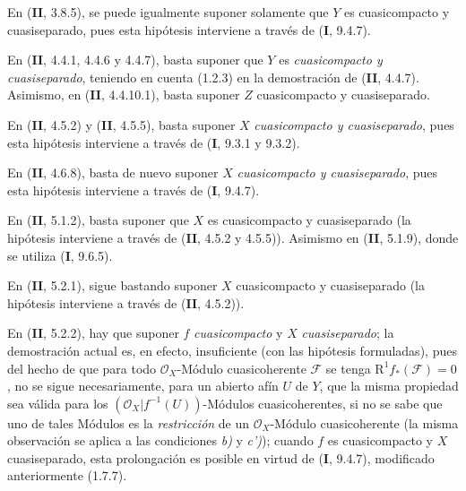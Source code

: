 \begin{env}[1.7.12]
\label{IV.1.7.12-fr}
En (\textbf{II}, 3.8.5), se puede igualmente suponer solamente que $Y$ es cuasicompacto
y cuasiseparado, pues esta hipótesis interviene a través de (\textbf{I}, 9.4.7).
\end{env}

\begin{env}[1.7.13]
\label{IV.1.7.13-fr}
En (\textbf{II}, 4.4.1, 4.4.6 y 4.4.7), basta suponer que $Y$ es
\emph{cuasicompacto y cuasiseparado}, teniendo en cuenta (1.2.3) en la
demostración de (\textbf{II}, 4.4.7). Asimismo, en (\textbf{II}, 4.4.10.1), basta
suponer $Z$ cuasicompacto y cuasiseparado.
\end{env}

\begin{env}[1.7.14]
\label{IV.1.7.14-fr}
En (\textbf{II}, 4.5.2) y (\textbf{II}, 4.5.5), basta suponer $X$
\emph{cuasicompacto y cuasiseparado}, pues esta hipótesis interviene a través de (\textbf{I},
9.3.1 y 9.3.2).
\end{env}

\begin{env}[1.7.15]
\label{IV.1.7.15-fr}
En (\textbf{II}, 4.6.8), basta de nuevo suponer $X$ \emph{cuasicompacto y
cuasiseparado}, pues esta hipótesis interviene a través de (\textbf{I}, 9.4.7).
\end{env}

\begin{env}[1.7.16]
\label{IV.1.7.16-fr}
En (\textbf{II}, 5.1.2), basta suponer que $X$ es cuasicompacto y
cuasiseparado (la hipótesis interviene a través de (\textbf{II}, 4.5.2 y 4.5.5)). Asimismo en
(\textbf{II}, 5.1.9), donde se utiliza (\textbf{I}, 9.6.5).
\end{env}

\begin{env}[1.7.17]
\label{IV.1.7.17-fr}
En (\textbf{II}, 5.2.1), sigue bastando suponer $X$ cuasicompacto y
cuasiseparado (la hipótesis interviene a través de (\textbf{II}, 4.5.2)).
\end{env}

\begin{env}[1.7.18]
\label{IV.1.7.18-fr}
En (\textbf{II}, 5.2.2), hay que suponer $f$ \emph{cuasicompacto} y $X$ \emph{cuasiseparado}; la
demostración actual es, en efecto, insuficiente (con las hipótesis formuladas),
pues del hecho de que para todo $\mathcal O_X$-Módulo cuasicoherente $\mathscr F$ se
tenga $\mathrm R^1f_*(\mathscr F)=0$, no se sigue necesariamente, para un
abierto afín $U$ de $Y$, que la misma propiedad sea válida para los
$(\mathcal O_X|f^{-1}(U))$-Módulos cuasicoherentes, si no se sabe que uno de tales
Módulos es la \emph{restricción} de un $\mathcal O_X$-Módulo cuasicoherente (la
misma observación se aplica a las condiciones \emph{b)} y \emph{c')}); cuando $f$ es
cuasicompacto y $X$ cuasiseparado, esta prolongación es posible en virtud de
(\textbf{I}, 9.4.7), modificado anteriormente (1.7.7).
\end{env}

